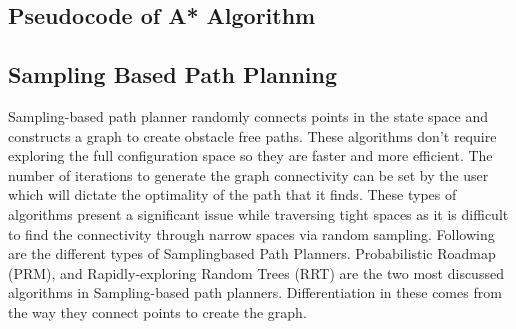 \documentclass[9pt,a4paper,twoside]{rho-class/rho}
\begin{document}
            \subsection{Pseudocode of A* Algorithm}

            \nolinenumbers
            
            \linenumbers

    


            \subsection{Sampling Based Path Planning}
            Sampling-based path planner randomly connects points in the state space and constructs a graph to create obstacle free paths. These algorithms don't require exploring the full configuration space so they are faster and more efficient. The number of iterations to generate the graph connectivity can be set by the user which will dictate the optimality of the path that it finds. These types of algorithms present a significant issue while traversing tight spaces as it is difficult to find the connectivity through narrow spaces via random sampling. Following are the different types of Samplingbased Path Planners. Probabilistic Roadmap (PRM), and Rapidly-exploring Random Trees (RRT) are the two most discussed algorithms in Sampling-based path planners. Differentiation in these comes from the way they connect points to create the graph.
\end{document}

